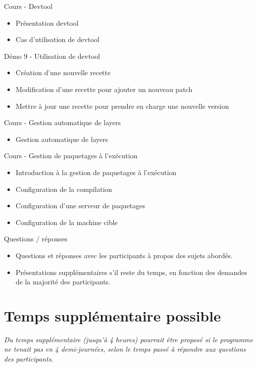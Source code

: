 \documentclass[a4paper,12pt,obeyspaces,spaces,hyphens]{article}
\begin{document}
\feagendatwocolumn
{Cours - Devtool}
{
  \begin{itemize}
  \item Présentation devtool
  \item Cas d'utilisation de devtool
  \end{itemize}
}
{Démo 9 - Utilisation de devtool}
{
  \begin{itemize}
  \item Création d'une nouvelle recette
  \item Modification d'une recette pour ajouter un nouveau patch
  \item Mettre à jour une recette pour prendre en charge une nouvelle version
  \end{itemize}
}

\feagendatwocolumn
{Cours - Gestion automatique de layers}
{
  \begin{itemize}
  \item Gestion automatique de layers
  \end{itemize}
}
{Cours - Gestion de paquetages à l'exécution}
{
  \begin{itemize}
  \item Introduction à la gestion de paquetages à l'exécution
  \item Configuration de la compilation
  \item Configuration d'une serveur de paquetages
  \item Configuration de la machine cible
  \end{itemize}
}

\feagendaonecolumn
{Questions / réponses}
{
  \begin{itemize}
  \item Questions et réponses avec les participants à propos des sujets abordés.
  \item Présentations supplémentaires s'il reste du temps, en fonction des demandes
        de la majorité des participants.
  \end{itemize}
}

\section{Temps supplémentaire possible}

{\em Du temps supplémentaire (jusqu'à 4 heures) pourrait être proposé si le programme ne tenait
     pas en 4 demi-journées, selon le temps passé à répondre aux questions des participants.}
\end{document}
